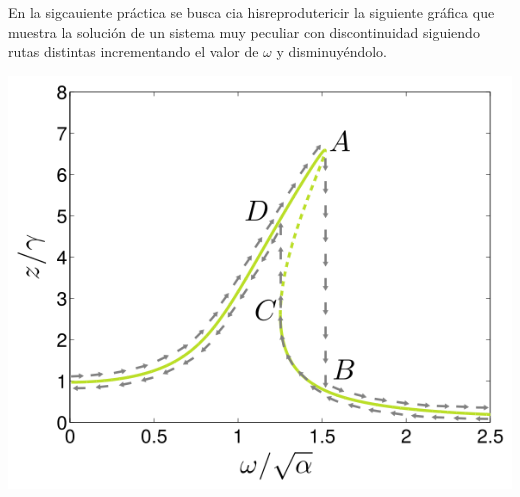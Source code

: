 \documentclass{article}
\begin{document}
En la sigcauiente práctica se busca cia hisreprodutericir la siguiente gráfica que muestra la solución de un sistema muy peculiar con discontinuidad siguiendo rutas distintas incrementando el valor de $\omega$ y disminuyéndolo.

\begin{center}
    \includegraphics[scale = 0.25]{DuffinG.png}
\end{center}
\end{document}
